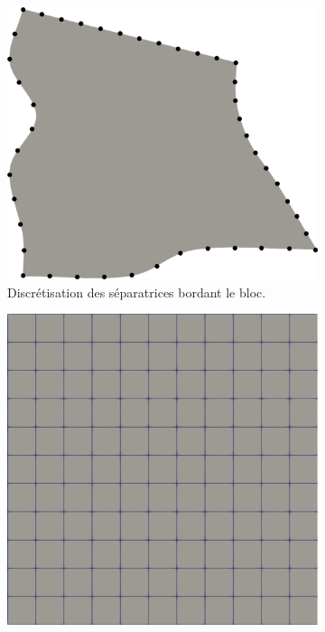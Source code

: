 \begin{figure}[h!]
\centering
\begin{subfigure}{0.5\textwidth}
    \includegraphics[width=\textwidth]{images/transfini_1.pdf}
    \caption{Discrétisation des séparatrices bordant le bloc.}
    \label{fig:transfini_1}
\end{subfigure}
\hfill
\begin{subfigure}{0.42\textwidth}
    \includegraphics[width=\textwidth]{images/transfini_2.pdf}

\end{subfigure}
\end{figure}

